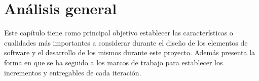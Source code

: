 \chapter{Análisis general}
\label{ch:analisis}

 Este capítulo tiene como principal objetivo establecer las características o cualidades más
 importantes a considerar durante el diseño de los elementos de software y el desarrollo de los
 mismos durante este proyecto. Además presenta la forma en que se ha seguido a los marcos de
 trabajo para establecer los incrementos y entregables de cada iteración.

    


    \clearpage
    

    \clearpage
    


    \clearpage

    

    

    \clearpage
    

